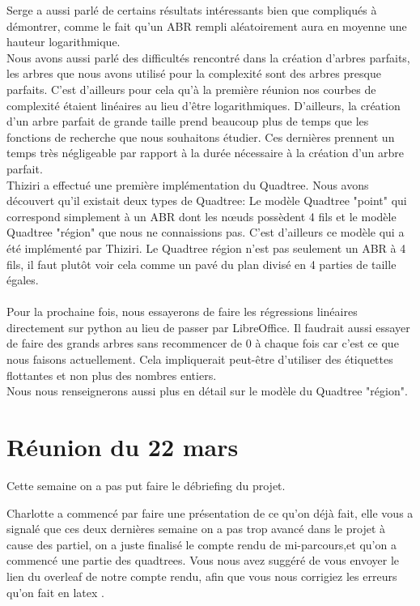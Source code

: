 \documentclass{report}
\begin{document}
Serge a aussi parlé de certains résultats intéressants bien que compliqués à démontrer, comme le fait qu'un ABR rempli aléatoirement aura en moyenne une hauteur logarithmique. \\

Nous avons aussi parlé des difficultés rencontré dans la création d'arbres parfaits, les arbres que nous avons utilisé pour la complexité sont des arbres presque parfaits. C'est d'ailleurs pour cela qu'à la première réunion nos courbes de complexité étaient linéaires au lieu d'être logarithmiques.
D'ailleurs, la création d'un arbre parfait de grande taille prend beaucoup plus de temps que les fonctions de recherche que nous souhaitons étudier. Ces dernières prennent un temps très négligeable par rapport à la durée nécessaire à la création d'un arbre parfait. \\

Thiziri a effectué une première implémentation du Quadtree. Nous avons découvert qu'il existait deux types de Quadtree: Le modèle Quadtree "point" qui correspond simplement à un ABR dont les nœuds possèdent 4 fils et le modèle Quadtree "région" que nous ne connaissions pas. C'est d'ailleurs ce modèle qui a été implémenté par Thiziri.
Le Quadtree région n'est pas seulement un ABR à 4 fils, il faut plutôt voir cela comme un pavé du plan divisé en 4 parties de taille égales. \\ \\

Pour la prochaine fois, nous essayerons de faire les régressions linéaires directement sur python au lieu de passer par LibreOffice. Il faudrait aussi essayer de faire des grands arbres sans recommencer de 0 à chaque fois car c'est ce que nous faisons actuellement. Cela impliquerait peut-être d'utiliser des étiquettes flottantes et non plus des nombres entiers. \\
Nous nous renseignerons aussi plus en détail sur le modèle du Quadtree "région".


\newpage
\section{Réunion du 22 mars}
Cette semaine on a pas put faire le débriefing du projet.

Charlotte a commencé par faire une présentation de ce qu'on déjà fait, elle vous a signalé que ces deux dernières semaine on a pas trop avancé dans le projet à cause des partiel,
on a juste finalisé le compte rendu de mi-parcours,et qu'on a commencé une partie des quadtrees. 
Vous nous avez suggéré de vous envoyer le lien du overleaf de notre compte rendu, afin que vous nous corrigiez les erreurs qu'on fait en latex .
\end{document}
